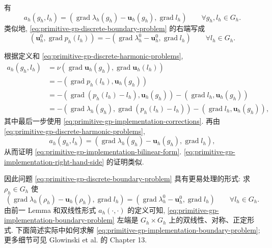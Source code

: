 \setcounter{statement}{3}
\renewcommand{\theHstatement}{lemma.\thesection.\arabic{statement}}
\begin{Lemma}\label{lem:primitive-gp-implementation-bilinear-form}
有
\begin{equation}\label{eq:primitive-gp-implementation-bilinear-form}
a_h(g_h,l_h)
=(\operatorname{grad}\lambda_h(g_h)-\mathbf u_h(g_h),
\operatorname{grad}l_h)
\qquad\forall g_h,l_h\in G_h.
\end{equation}
类似地, \eqref{eq:primitive-gp-discrete-boundary-problem} 的右端写成
\begin{equation}\label{eq:primitive-gp-implementation-right-hand-side}
(\mathbf u_h^0,\operatorname{grad}p_h(l_h))
=-(\operatorname{grad}\lambda_h^0-\mathbf u_h^0,
\operatorname{grad}l_h)
\qquad\forall l_h\in G_h.
\end{equation}
\end{Lemma}

\begin{Proof}
根据定义和 \eqref{eq:primitive-gp-discrete-harmonic-problems},
\[
\begin{aligned}
a_h(g_h,l_h)
&=\nu(\operatorname{grad}\mathbf u_h(g_h),
\operatorname{grad}\mathbf u_h(l_h))\\
&=-(\operatorname{grad}p_h(l_h),\mathbf u_h(g_h))\\
&=-(\operatorname{grad}(p_h(l_h)-l_h),\mathbf u_h(g_h))
-(\operatorname{grad}l_h,\mathbf u_h(g_h))\\
&=-(\operatorname{grad}\lambda_h(g_h),
\operatorname{grad}(p_h(l_h)-l_h))
-(\operatorname{grad}l_h,\mathbf u_h(g_h)),
\end{aligned}
\]
其中最后一步使用 \eqref{eq:primitive-gp-implementation-corrections}.
再由 \eqref{eq:primitive-gp-discrete-harmonic-problems},
\[
a_h(g_h,l_h)
=(\operatorname{grad}\lambda_h(g_h)-\mathbf u_h(g_h),
\operatorname{grad}l_h),
\]
从而证明 \eqref{eq:primitive-gp-implementation-bilinear-form}.
\eqref{eq:primitive-gp-implementation-right-hand-side} 的证明类似.
\end{Proof}

因此问题 \eqref{eq:primitive-gp-discrete-boundary-problem} 具有更易处理的形式:
求 $\rho_h\in G_h$ 使
\begin{equation}\label{eq:primitive-gp-implementation-boundary-problem}
(\operatorname{grad}\lambda_h(\rho_h)-\mathbf u_h(\rho_h),
\operatorname{grad}l_h)
=(\operatorname{grad}\lambda_h^0-\mathbf u_h^0,
\operatorname{grad}l_h)
\qquad\forall l_h\in G_h.
\end{equation}
由前一 Lemma 和双线性形式 $a_h(\cdot,\cdot)$ 的定义可知,
\eqref{eq:primitive-gp-implementation-boundary-problem} 左端是
$G_h\times G_h$ 上的双线性、对称、正定形式. 下面简述实际中如何求解
\eqref{eq:primitive-gp-implementation-boundary-problem}; 更多细节可见
Glowinski et al. 的 Chapter 13.

